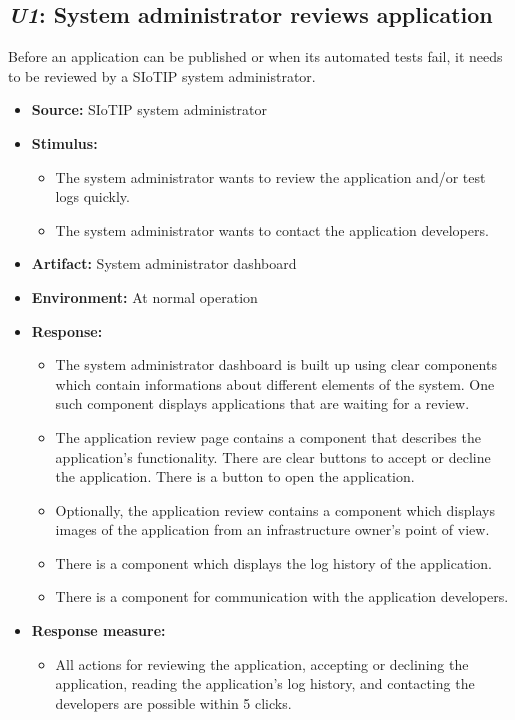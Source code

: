 \subsection{\emph{U1}: System administrator reviews application}
Before an application can be published or when its automated tests
fail, it needs to be reviewed by a SIoTIP system administrator.

\begin{itemize}
    \item \textbf{Source:} SIoTIP system administrator
    \item \textbf{Stimulus:}
        \begin{itemize}
            \item The system administrator wants to review the application
                  and/or test logs quickly.
            \item The system administrator wants to contact the application
                  developers.
        \end{itemize}
    \item \textbf{Artifact:} System administrator dashboard
    \item \textbf{Environment:} At normal operation
    \item \textbf{Response:}
        \begin{itemize}
            \item The system administrator dashboard is built up using clear
                  components which contain informations about different
                  elements of the system. One such component displays applications
                  that are waiting for a review.
            \item The application review page contains a component that
                  describes the application's functionality. There are clear
                  buttons to accept or decline the application. There is a
                  button to open the application.
            \item Optionally, the application review contains a component which
                  displays images  of the application from an infrastructure
                  owner's point of view.
            \item There is a component which displays the log history of the application.
            \item There is a component for communication with the application developers.
        \end{itemize}

    \item \textbf{Response measure:}
        \begin{itemize}
            \item All actions for reviewing the application, accepting or
                  declining the application, reading the application's log history,
                  and contacting the developers are possible within 5 clicks.
        \end{itemize}
\end{itemize}

